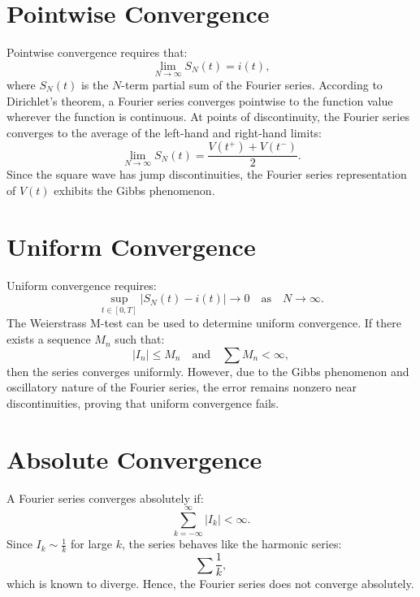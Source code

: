 \section{Pointwise Convergence}
Pointwise convergence requires that:
\begin{equation}
\lim_{N \to \infty} S_N(t) = i(t),
\end{equation}
where $S_N(t)$ is the $N$-term partial sum of the Fourier series. According to Dirichlet's theorem, a Fourier series converges pointwise to the function value wherever the function is continuous. At points of discontinuity, the Fourier series converges to the average of the left-hand and right-hand limits:
\begin{equation}
\lim_{N \to \infty} S_N(t) = \frac{V(t^+) + V(t^-)}{2}.
\end{equation}
Since the square wave has jump discontinuities, the Fourier series representation of $V(t)$ exhibits the Gibbs phenomenon.

\section{Uniform Convergence}
Uniform convergence requires:
\begin{equation}
\sup_{t \in [0,T]} |S_N(t) - i(t)| \to 0 \quad \text{as} \quad N \to \infty.
\end{equation}
The Weierstrass M-test can be used to determine uniform convergence. If there exists a sequence $M_n$ such that:
\begin{equation}
|I_n| \leq M_n \quad \text{and} \quad \sum M_n < \infty,
\end{equation}
then the series converges uniformly. However, due to the Gibbs phenomenon and oscillatory nature of the Fourier series, the error remains nonzero near discontinuities, proving that uniform convergence fails.

\section{Absolute Convergence}
A Fourier series converges absolutely if:
\begin{equation}
\sum_{k=-\infty}^{\infty} |I_k| < \infty.
\end{equation}
Since $I_k \sim \frac{1}{k}$ for large $k$, the series behaves like the harmonic series:
\begin{equation}
\sum \frac{1}{k},
\end{equation}
which is known to diverge. Hence, the Fourier series does not converge absolutely.

